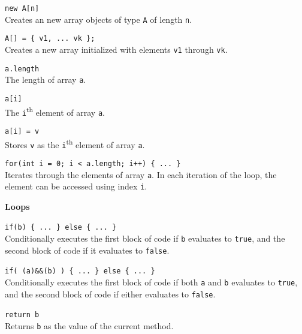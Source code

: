 \documentclass[10pt,twocolumn]{article}
\begin{document}
\begin{description}
\item{\texttt{new A[n]}} \\[.25em]
Creates an new array objects of type \texttt{A} of length
\texttt{n}. 

\item{\texttt{A[] = \{ v1, ... vk \};}} \\[.25em] 
Creates a new array initialized with elements \texttt{v1} through \texttt{vk}. 


\item{\texttt{a.length}} \\[.25em]
The length of array \texttt{a}. 

\item{\texttt{a[i]}} \\[.25em]
The \texttt{i}\textsuperscript{th} element of array \texttt{a}. 

\item{\texttt{a[i] = v}} \\[.25em]
Stores \texttt{v} as the \texttt{i}\textsuperscript{th} element of array \texttt{a}. 

\item{\texttt{for(int i = 0; i < a.length; i++) \{ ... \}}} \\[.25em]
  Iterates through the elements of array \texttt{a}. In each iteration
  of the loop, the element can be accessed using index \texttt{i}.
\end{description}


\noindent\textbf{\large Loops}
\begin{description}

\item{\texttt{if(b) \{ ... \} else \{ ... \}}}\ \\[.25em] 
% 
Conditionally executes the first block of code if \texttt{b} evaluates to
\texttt{true}, and the second block of code if it evaluates to \texttt{false}.

\item{\texttt{if( (a)\&\&(b) ) \{ ... \} else \{ ... \}}}\ \\[.25em] 
% 
Conditionally executes the first block of code if both \texttt{a} and \texttt{b} evaluates to
\texttt{true}, and the second block of code if either evaluates to \texttt{false}.

\item{\texttt{return b}} \ \\[.25em]
%
  Returns \texttt{b} as the value of the current method.
\end{description}
\end{document}
